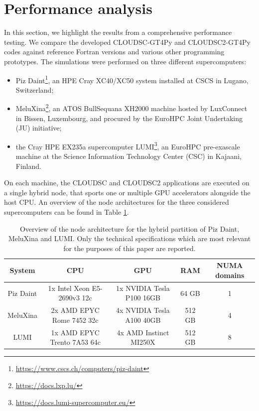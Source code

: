\documentclass[gmd,manuscript,online]{copernicus}
\begin{document}
	\section{Performance analysis}
	\label{section:performance-analysis}

	In this section, we highlight the results from a comprehensive performance testing. We compare the developed CLOUDSC-GT4Py and CLOUDSC2-GT4Py codes against reference Fortran versions and various other programming prototypes. The simulations were performed on three different supercomputers:
	\begin{itemize}
		\item[(i)] Piz Daint\footnote{\url{https://www.cscs.ch/computers/piz-daint}}, an HPE Cray XC40/XC50 system installed at CSCS in Lugano, Switzerland;
		\item[(ii)] MeluXina\footnote{\url{https://docs.lxp.lu/}}, an ATOS BullSequana XH2000 machine hosted by LuxConnect in Bissen, Luxembourg, and procured by the EuroHPC Joint Undertaking (JU) initiative;
		\item[(iii)] the Cray HPE EX235a supercomputer LUMI\footnote{\url{https://docs.lumi-supercomputer.eu/}}, an EuroHPC pre-exascale machine at the Science Information Technology Center (CSC) in Kajaani, Finland.
	\end{itemize}
	On each machine, the CLOUDSC and CLOUDSC2 applications are executed on a single hybrid node, that sports one or multiple GPU accelerators alongside the host CPU. An overview of the node architectures for the three considered supercomputers can be found in Table \ref{tab:architecture}.

	\begin{table}[t!]
		\setlength\extrarowheight{2pt}
		\centering
		\begin{tabular}{|c|c|c|c|c|}
			\hline
			\textbf{System} & \textbf{CPU} & \textbf{GPU} & \textbf{RAM} & \textbf{NUMA domains} \\
			\hline
			Piz Daint & 1x Intel Xeon E5-2690v3 12c & 1x NVIDIA Tesla P100 16GB & 64 GB & 1 \\
			MeluXina & 2x AMD EPYC Rome 7452 32c & 4x NVIDIA Tesla A100 40GB & 512 GB & 4 \\
			LUMI & 1x AMD EPYC Trento 7A53 64c & 4x AMD Instinct MI250X & 512 GB & 8 \\
			\hline
		\end{tabular}
		\vspace*{0.2cm}
		\caption{Overview of the node architecture for the hybrid partition of Piz Daint, MeluXina and LUMI. Only the technical specifications which are most relevant for the purposes of this paper are reported.}
		\label{tab:architecture}
	\end{table}
\end{document}
